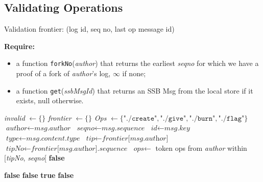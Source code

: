 \documentclass[sigplan,screen,10pt]{acmart}
\begin{document}
\subsection{Validating Operations}

Validation frontier: (log id, seq no, last op message id)

\begin{algorithm}
\begin{algorithmic}[1]
  \Statex \textbf{Require:} 
  \begin{itemize}
    \item a function \texttt{forkNo}(\textit{author}) that returns the earliest \textit{seqno} for which we have a proof of a fork of \textit{author}'s log, $\infty$ if none; 
    \item a function \texttt{get}(\textit{ssbMsgId}) that returns an SSB Msg from the local store if it exists, null otherwise.
  \end{itemize}
  \State 
  \State \textit{invalid} $\leftarrow \{ \}$ 
  \State \textit{frontier} $\leftarrow \{ \}$  
  \State {}
  \State \textit{Ops} $\leftarrow \{ \texttt{"./create"}, \texttt{"./give"}, \texttt{"./burn"}, \texttt{"./flag"} \}$
  \State
      \State $\textit{author} \leftarrow \textit{msg.author}$
       \State $\textit{seqno} \leftarrow \textit{msg.sequence}$
       \State $\textit{id} \leftarrow \textit{msg.key}$
       \State $\textit{type} \leftarrow \textit{msg.content.type}$
       \State $\textit{tip} \leftarrow \textit{frontier[msg.author]}$       
       \State $\textit{tipNo} \leftarrow \textit{frontier}\textit{[msg.author].sequence}$
       \State $\textit{ops} \leftarrow $ token ops from \textit{author} within [\textit{tipNo}, \textit{seqno}[
       \State
        \Return \textbf{false}
       
       \Return \textbf{false}
       \Return \textbf{false}
          \State \Return \textbf{true}
          \State \Return \textbf{false}
      \EndIf


\end{algorithmic}
\end{algorithm}
\end{document}
